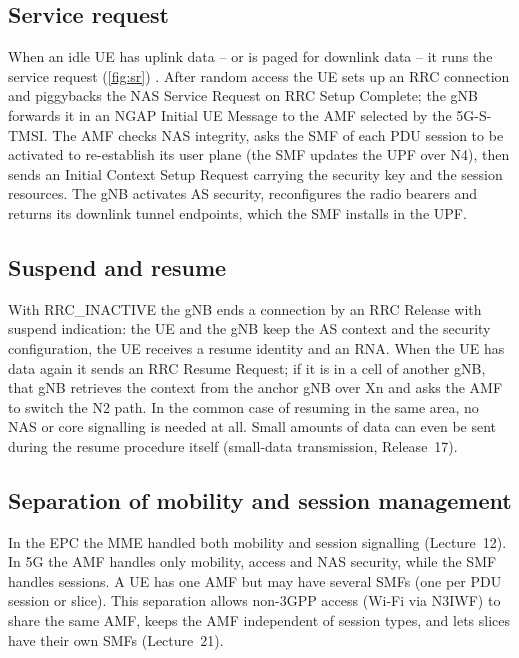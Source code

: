 \documentclass[11pt,a4paper]{article}
\begin{document}
\subsection{Service request}
When an idle UE has uplink data -- or is paged for downlink data -- it runs the service request (\cref{fig:sr}) \cite{ts23502}. After random
access the UE sets up an RRC connection and piggybacks the NAS Service Request on RRC Setup Complete; the gNB forwards it in an NGAP Initial
UE Message to the AMF selected by the 5G-S-TMSI. The AMF checks NAS integrity, asks the SMF of each PDU session to be activated to re-establish
its user plane (the SMF updates the UPF over N4), then sends an Initial Context Setup Request carrying the security key and the session
resources. The gNB activates AS security, reconfigures the radio bearers and returns its downlink tunnel endpoints, which the SMF installs in
the UPF.

\begin{acnfigure}
  \caption{UE-triggered service request from CM-IDLE (simplified, after TS~23.502).}
  \label{fig:sr}
\end{acnfigure}

\subsection{Suspend and resume}
With RRC\_INACTIVE the gNB ends a connection by an RRC Release with suspend indication: the UE and the gNB keep the AS context and the
security configuration, the UE receives a resume identity and an RNA. When the UE has data again it sends an RRC Resume Request; if it is
in a cell of another gNB, that gNB retrieves the context from the anchor gNB over Xn and asks the AMF to switch the N2 path. In the common case
of resuming in the same area, no NAS or core signalling is needed at all. Small amounts of data can even be sent during the resume procedure
itself (small-data transmission, Release~17).

\subsection{Separation of mobility and session management}
In the EPC the MME handled both mobility and session signalling (Lecture~12). In 5G the AMF handles only mobility, access and NAS security,
while the SMF handles sessions. A UE has one AMF but may have several SMFs (one per PDU session or slice). This separation allows non-3GPP
access (Wi-Fi via N3IWF) to share the same AMF, keeps the AMF independent of session types, and lets slices have their own SMFs (Lecture~21).
\end{document}
